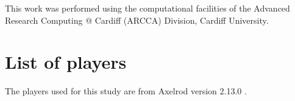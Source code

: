 \documentclass{article}
\begin{document}
This work was performed using the computational facilities of the Advanced
Research Computing @ Cardiff (ARCCA) Division, Cardiff University.

\printbibliography

\appendix

\section{List of players}\label{app:list_of_players}

The players used for this study are from Axelrod version 2.13.0
\cite{axelrodproject}.

\begin{multicols}{2}
	\begin{enumerate}
		
	\end{enumerate}
\end{multicols}
\end{document}
